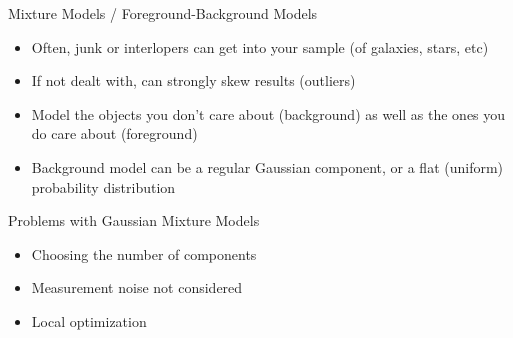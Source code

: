 \documentclass[compress,t]{beamer}
\begin{document}
\begin{frame}{Mixture Models / Foreground-Background Models}
  \begin{itemize}
    \item Often, \alert{junk} or \alert{interlopers} can get into your
      sample (of galaxies, stars, etc)
    \item If not dealt with, can strongly skew results (outliers)
    \item \alert{Model} the objects you don't care about (background)
      \alert{as well as} the ones you do care about (foreground)
    \item Background model can be a regular Gaussian component, or a
      flat (uniform) probability distribution
  \end{itemize}
\end{frame}

\begin{frame}{Problems with Gaussian Mixture Models}
  \begin{itemize}
  \item Choosing the number of components
  \item Measurement noise not considered
  \item Local optimization
  \end{itemize}
\end{frame}


\end{document}
